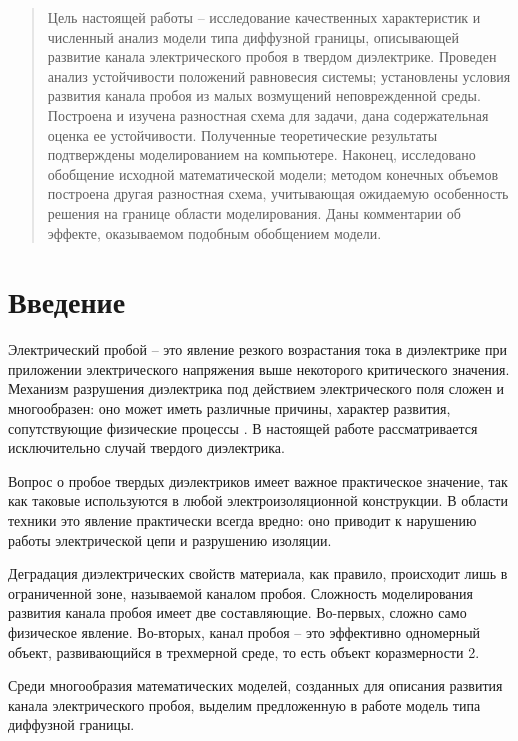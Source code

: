 \documentclass[a4paper,12pt]{article}
\theoremstyle{plain}
\theoremstyle{definition}
\begin{document}
\begin{abstract}
    Цель настоящей работы -- исследование качественных характеристик и численный анализ модели типа диффузной границы, описывающей развитие канала электрического пробоя в твердом диэлектрике. Проведен анализ устойчивости положений равновесия системы; установлены условия развития канала пробоя из малых возмущений неповрежденной среды. Построена и изучена разностная схема для задачи, дана содержательная оценка ее устойчивости. Полученные теоретические результаты подтверждены моделированием на компьютере. Наконец, исследовано обобщение исходной математической модели; методом конечных объемов построена другая разностная схема, учитывающая ожидаемую особенность решения на границе области моделирования. Даны комментарии об эффекте, оказываемом подобным обобщением модели.
\end{abstract}

\setcounter{page}{2}
\tableofcontents
\pagebreak


\section{Введение}

Электрический пробой -- это явление резкого возрастания тока в диэлектрике при приложении электрического напряжения выше некоторого критического значения. Механизм разрушения диэлектрика под действием электрического поля сложен и многообразен: оно может иметь различные причины, характер развития, сопутствующие физические процессы \cite{vorobiev_dielectric_physics}. В настоящей работе рассматривается исключительно случай твердого диэлектрика.

Вопрос о пробое твердых диэлектриков имеет важное практическое значение, так как таковые используются в любой электроизоляционной конструкции. В области техники это явление практически всегда вредно: оно приводит к нарушению работы электрической цепи и разрушению изоляции.

Деградация диэлектрических свойств материала, как правило, происходит лишь в ограниченной зоне, называемой каналом пробоя. Сложность моделирования развития канала пробоя имеет две составляющие. Во-первых, сложно само физическое явление. Во-вторых, канал пробоя -- это эффективно одномерный объект, развивающийся в трехмерной среде, то есть объект коразмерности 2.

Среди многообразия математических моделей, созданных для описания развития канала электрического пробоя, выделим предложенную в работе \cite{pitike_dielectric_breakdown} модель типа диффузной границы.
\end{document}
